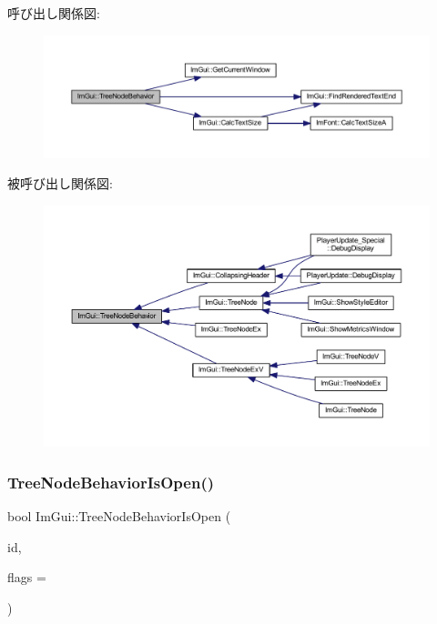 呼び出し関係図\+:\nopagebreak
\begin{figure}[H]
\begin{center}
\leavevmode
\includegraphics[width=350pt]{namespace_im_gui_a918eabf70d288e93b2519ee1eac2c0b4_cgraph}
\end{center}
\end{figure}
被呼び出し関係図\+:\nopagebreak
\begin{figure}[H]
\begin{center}
\leavevmode
\includegraphics[width=350pt]{namespace_im_gui_a918eabf70d288e93b2519ee1eac2c0b4_icgraph}
\end{center}
\end{figure}
\mbox{\label{namespace_im_gui_a22cc50485aad6da8a3a4e156b500ed4a}} 
\subsubsection{\texorpdfstring{Tree\+Node\+Behavior\+Is\+Open()}{TreeNodeBehaviorIsOpen()}}
{\footnotesize\ttfamily bool Im\+Gui\+::\+Tree\+Node\+Behavior\+Is\+Open (\begin{DoxyParamCaption}\item[{\mbox{\hyperlink{imgui_8h_a1785c9b6f4e16406764a85f32582236f}{Im\+Gui\+ID}}}]{id,  }\item[{\mbox{\hyperlink{imgui_8h_a0588fdd10c59b49a0159484fe9ec4564}{Im\+Gui\+Tree\+Node\+Flags}}}]{flags = {} }\end{DoxyParamCaption})}




